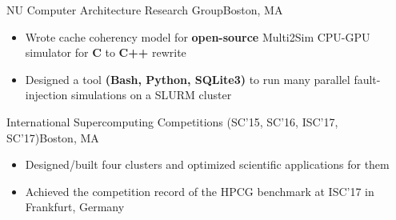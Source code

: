 \documentclass[11pt,letterpaper,sans]{moderncv}
\begin{document}
\vspace{-1pt}

\begin{itemize}

\item[] {
{NU Computer Architecture Research Group}{Boston, MA}{}{\vspace{1pt}}
\vspace{-9pt}	\begin{itemize}
		\item Wrote cache coherency model for \textbf{open-source} Multi2Sim CPU-GPU simulator for \textbf{C} to \textbf{C++} rewrite
		\item Designed a tool \textbf{(Bash, Python, SQLite3)} to run many parallel fault-injection simulations on a SLURM cluster
		\end{itemize}

\vspace{6pt}


\item[] {
{International Supercomputing Competitions (SC'15, SC'16, ISC'17, SC'17)}{Boston, MA}{}{\vspace{1pt}}
\vspace{-9pt}	\begin{itemize}
		\item Designed/built four clusters and optimized scientific applications for them
		\item Achieved the competition record of the HPCG benchmark at ISC'17 in Frankfurt, Germany
		\end{itemize}
}

		
}

\end{itemize}
\vspace{-8pt}
\end{document}
